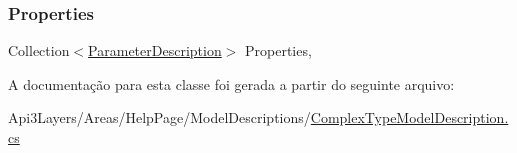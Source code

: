 \subsubsection{\texorpdfstring{Properties}{Properties}}
{\footnotesize\ttfamily Collection$<$\hyperlink{classApi3Layers_1_1Areas_1_1HelpPage_1_1ModelDescriptions_1_1ParameterDescription}{Parameter\+Description}$>$ Properties\hspace{0.3cm}{\ttfamily [get]}, {}}



A documentação para esta classe foi gerada a partir do seguinte arquivo\+:\begin{DoxyCompactItemize}
\item 
Api3\+Layers/\+Areas/\+Help\+Page/\+Model\+Descriptions/\hyperlink{ComplexTypeModelDescription_8cs}{Complex\+Type\+Model\+Description.\+cs}\end{DoxyCompactItemize}
